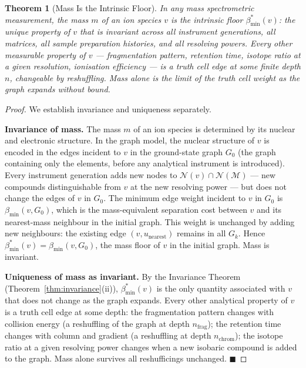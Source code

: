\documentclass[11pt,twocolumn,a4paper]{article}
\theoremstyle{plain}
\newtheorem{theorem}{Theorem}[section]
\theoremstyle{definition}
\theoremstyle{remark}
\newcommand{\med}{\mathcal{M}}
\newcommand{\Nbd}{\mathcal{N}}
\newcommand{\bmin}{\beta_{\min}}
\renewcommand{\qed}{\hfill$\blacksquare$}
\begin{document}
\begin{theorem}[Mass Is the Intrinsic Floor]
\label{thm:mass_as_floor}
In any mass spectrometric measurement, the mass $m$ of an ion species $v$
is the intrinsic floor $\bmin^*(v)$: the unique property of $v$ that is
invariant across all instrument generations, all matrices, all sample
preparation histories, and all resolving powers. Every other measurable
property of $v$ --- fragmentation pattern, retention time, isotope ratio
at a given resolution, ionisation efficiency --- is a truth cell edge at
some finite depth $n$, changeable by reshuffling. Mass alone is the limit
of the truth cell weight as the graph expands without bound.
\end{theorem}

\begin{proof}
We establish invariance and uniqueness separately.

\textbf{Invariance of mass.} The mass $m$ of an ion species is determined
by its nuclear and electronic structure. In the graph model, the nuclear
structure of $v$ is encoded in the edges incident to $v$ in the ground-state
graph $G_0$ (the graph containing only the elements, before any analytical
instrument is introduced). Every instrument generation adds new nodes to
$\Nbd(v) \cap \Nbd(\med)$ --- new compounds distinguishable from $v$ at the
new resolving power --- but does not change the edges of $v$ in $G_0$.
The minimum edge weight incident to $v$ in $G_0$ is $\bmin(v, G_0)$, which
is the mass-equivalent separation cost between $v$ and its nearest-mass
neighbour in the initial graph. This weight is unchanged by adding new
neighbours: the existing edge $(v, u_{\mathrm{nearest}})$ remains in all
$G_k$. Hence $\bmin^*(v) = \bmin(v, G_0)$, the mass floor of $v$ in the
initial graph. Mass is invariant.

\textbf{Uniqueness of mass as invariant.} By the Invariance Theorem
(Theorem~\ref{thm:invariance}(ii)), $\bmin^*(v)$ is the only quantity
associated with $v$ that does not change as the graph expands. Every
other analytical property of $v$ is a truth cell edge at some depth:
the fragmentation pattern changes with collision energy (a reshuffling
of the graph at depth $n_{\mathrm{frag}}$); the retention time changes
with column and gradient (a reshuffling at depth $n_{\mathrm{chrom}}$);
the isotope ratio at a given resolving power changes when a new
isobaric compound is added to the graph. Mass alone survives all
reshufficings unchanged. \qed
\end{proof}
\end{document}
